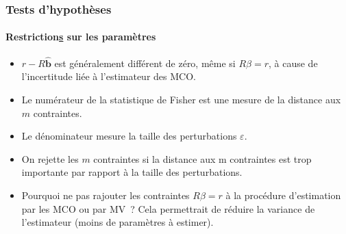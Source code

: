 \documentclass[10pt]{beamer}
\theoremstyle{plain}
\begin{document}
\begin{frame}
  \frametitle{Tests d'hypothèses}
  \framesubtitle{Restriction\underline{s} sur les paramètres}

  \begin{itemize}

  \item $r-R\hat{\mathbf b}$ est généralement différent de zéro, même
    si $R\beta = r$, à cause de l'incertitude liée à l'estimateur des
    MCO.\newline

  \item Le numérateur de la statistique de Fisher est une mesure de la distance aux $m$ contraintes.\newline

  \item Le dénominateur mesure la taille des perturbations $\varepsilon$.\newline

  \item On rejette les $m$ contraintes si la distance aux m contraintes est trop importante par rapport à la taille des perturbations.\newline

  \item Pourquoi ne pas rajouter les contraintes $R\beta=r$ à la procédure d'estimation par les MCO ou par MV~? Cela permettrait de réduire la variance de l'estimateur (moins de paramètres à estimer).

  \end{itemize}

\end{frame}
\end{document}
